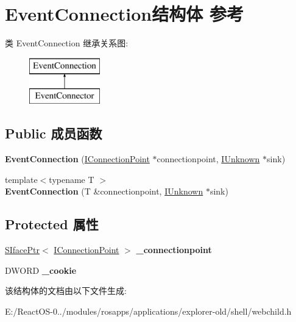 \hypertarget{struct_event_connection}{}\section{Event\+Connection结构体 参考}
\label{struct_event_connection}
类 Event\+Connection 继承关系图\+:\begin{figure}[H]
\begin{center}
\leavevmode
\includegraphics[height=2.000000cm]{struct_event_connection}
\end{center}
\end{figure}
\subsection*{Public 成员函数}
\begin{DoxyCompactItemize}
\item 
\mbox{\label{struct_event_connection_a9ce98954449ee20898921dc166508be8}} 
{\bfseries Event\+Connection} (\hyperlink{interface_i_connection_point}{I\+Connection\+Point} $\ast$connectionpoint, \hyperlink{interface_i_unknown}{I\+Unknown} $\ast$sink)
\item 
\mbox{\label{struct_event_connection_abd3178a1e08d9db4728fc05a8ea7d560}} 
{\footnotesize template$<$typename T $>$ }\\{\bfseries Event\+Connection} (T \&connectionpoint, \hyperlink{interface_i_unknown}{I\+Unknown} $\ast$sink)
\end{DoxyCompactItemize}
\subsection*{Protected 属性}
\begin{DoxyCompactItemize}
\item 
\mbox{\label{struct_event_connection_aea522150207c533a9ea6e6dde30fb012}} 
\hyperlink{struct_s_iface_ptr}{S\+Iface\+Ptr}$<$ \hyperlink{interface_i_connection_point}{I\+Connection\+Point} $>$ {\bfseries \+\_\+connectionpoint}
\item 
\mbox{\label{struct_event_connection_a71f9b82d6ea8d1b0202d1aee3dcde321}} 
D\+W\+O\+RD {\bfseries \+\_\+cookie}
\end{DoxyCompactItemize}


该结构体的文档由以下文件生成\+:\begin{DoxyCompactItemize}
\item 
E\+:/\+React\+O\+S-\/0../modules/rosapps/applications/explorer-\/old/shell/webchild.\+h\end{DoxyCompactItemize}
